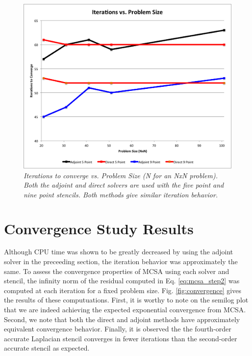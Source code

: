 \documentclass[note]{TechNote}
\begin{document}
\begin{figure}[htbp!]
  \centering
  \includegraphics[width=5in]{AdjointDirectIterations.png}
  \caption{\sl Iterations to converge vs. Problem Size (N for an NxN
    problem). Both the adjoint and direct solvers are used with the
    five point and nine point stencils. Both methods give similar
    iteration behavior.}
  \label{fig:iterations}
\end{figure}

\section{Convergence Study Results}
Although CPU time was shown to be greatly decreased by using the
adjoint solver in the preceeding section, the iteration behavior was
approximately the same. To assess the convergence properties of MCSA
using each solver and stencil, the infinity norm of the residual
computed in Eq. \ref{eq:mcsa_step2} was computed at each iteration for
a fixed problem size. Fig. \ref{fig:convergence} gives the results of
these computuations. First, it is worthy to note on the semilog plot
that we are indeed achieving the expected exponential convergence from
MCSA. Second, we note that both the direct and adjoint methods have
approximately equivalent convergence behavior. Finally, it is observed
the the fourth-order accurate Laplacian stencil converges in fewer
iterations than the second-order accurate stencil as expected.
\end{document}
